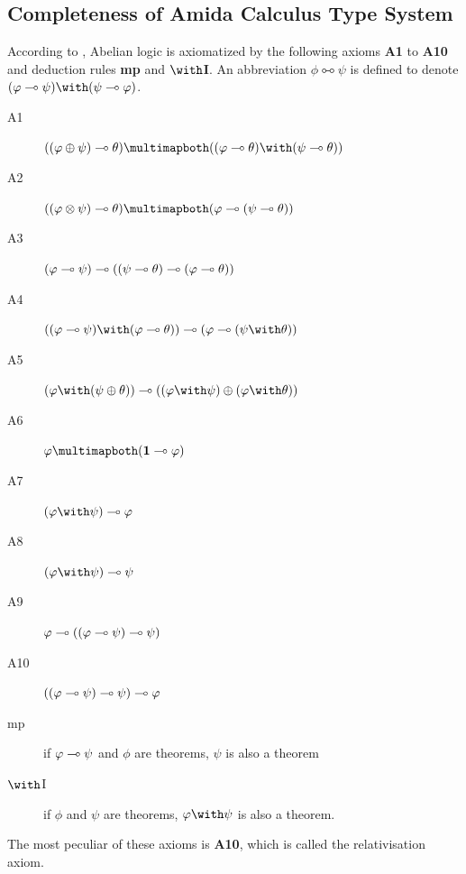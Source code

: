 \subsection{Completeness of Amida Calculus Type System}

According to \citet{metcalfe2002}, Abelian logic is axiomatized by the
following axioms \textbf{A1} to \textbf{A10} and deduction rules
\textbf{mp} and $\with$\textbf{I}.  An abbreviation $\phi
\multimapboth \psi$ is defined to denote $(\phi\limp \psi)\with
(\psi\limp\phi)$.
\begin{description}
 \item[A1] $((\phi\oplus\psi)\limp\theta)\multimapboth
      ((\phi\limp\theta)\with(\psi\limp\theta))$
 \item[A2]
      $((\phi\otimes\psi)\limp\theta)\multimapboth(\phi\limp(\psi\limp\theta))$
 \item[A3]
      $(\varphi\multimap\psi)\multimap((\psi\multimap\theta)\multimap(\varphi\multimap\theta))$
 \item[A4]
      $((\phi\limp\psi)\with(\phi\limp\theta))\limp(\phi\limp(\psi\with\theta))$
 \item[A5]
      $(\phi\with(\psi\oplus\theta))\limp ((\phi\with\psi)\oplus
      (\phi\with\theta))$
 \item[A6]
      $\phi\multimapboth (\one\limp\phi)$
 \item[A7]
      $(\phi\with\psi)\limp\phi$
 \item[A8]
      $(\phi\with\psi)\limp\psi$
 \item[A9]
      $\varphi\multimap((\varphi\multimap\psi)\multimap\psi)$
 \item[A10]
      $((\varphi\multimap\psi)\multimap\psi)\multimap\varphi$
 \item[mp]
      if $\varphi\multimap\psi$ and $\phi$ are theorems, $\psi$ is also a
      theorem
 \item[$\with$I] if $\phi$ and $\psi$ are theorems, $\phi\with\psi$ is
      also a theorem.
\end{description}
The most peculiar of these axioms is \textbf{A10}, which is called the
relativisation axiom.

